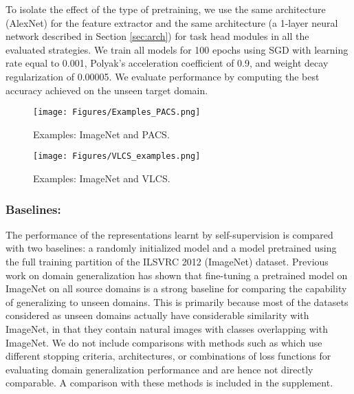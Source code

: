 \documentclass[runningheads]{llncs}
\begin{document}
To isolate the effect of the type of pretraining, we use the same architecture (AlexNet) for the feature extractor  and the same architecture (a 1-layer neural network described in Section \ref{sec:arch}) for task head modules in all the evaluated strategies. 
We train all models for 100 epochs using SGD with learning rate equal to 0.001, Polyak's acceleration coefficient of 0.9, and weight decay regularization of 0.00005. We evaluate performance by computing the best accuracy achieved on the unseen target domain.\vspace{-5pt}

\begin{figure}[t]
\begin{minipage}[t]{0.49\linewidth}
\centering
\texttt{[image: Figures/Examples\_PACS.png]}
\caption{Examples: ImageNet and PACS.}
\label{fig:example_pacs}
\end{minipage}
\hspace{0.5cm}
\begin{minipage}[t]{0.49\linewidth}
\centering
\texttt{[image: Figures/VLCS\_examples.png]}
\caption{Examples: ImageNet and VLCS.}
\label{fig:example_vlcs}
\end{minipage}
\end{figure}

\vspace{-5pt}\subsubsection{Baselines:} The performance of the representations learnt by self-supervision is compared with two baselines: a randomly initialized model and a model pretrained using the full training partition of the ILSVRC 2012 (ImageNet) dataset. Previous work on domain generalization has shown that fine-tuning a pretrained model on ImageNet on all source domains is a strong baseline for comparing the capability of generalizing to unseen domains. This is primarily because most of the datasets considered as unseen domains actually have considerable similarity with ImageNet, in that they contain natural images with classes overlapping with ImageNet. We do not include comparisons with methods such as \cite{li2018domain,li2018learning,carlucci2019domain} which use different stopping criteria, architectures, or combinations of loss functions for evaluating domain generalization performance and are hence not directly comparable. A comparison with these methods is included in the supplement.
\end{document}
